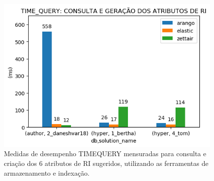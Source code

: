 \begin{figure}[ht]
    \centering
    \caption{Medidas de desempenho TIME\underscore{}QUERY mensuradas para consulta e criação dos 6 atributos de RI sugeridos, utilizando as ferramentas de armazenamento e indexação.}
    \vspace{-0.5cm}
    \begin{center}
        \includegraphics[scale=0.75]{img/time-query.png}
    \end{center}
    \vspace{-0.5cm}
    \label{fig:time-query}
\end{figure}